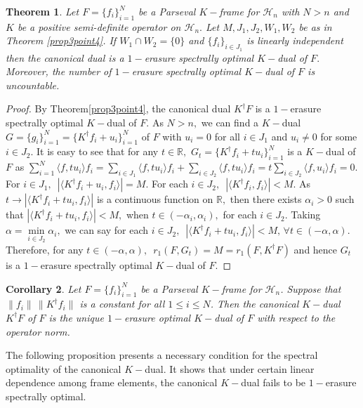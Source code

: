 \documentclass[final,1p,times]{elsarticle}
\newtheorem{thm}{Theorem}[section]
\newtheorem{cor}[thm]{Corollary}
\begin{document}
		\begin{thm}\label{thm3point4}
		Let $F = \{f_i\}_{i=1}^N $ be a Parseval $K-$frame for $\mathcal{H}_n$ with $N>n$ and $K$ be a positive semi-definite operator on $\mathcal{H}_n.$ Let $M, J_1, J_2, W_1, W_2$ be as in Theorem \ref{prop3point4}. If $W_1 \cap W_2 = \{0\}$ and $\{f_i\}_{i \in J_1}$ is linearly independent then the canonical dual is a $1-$erasure spectrally optimal $K-$dual of $F.$ Moreover, the number of  $1-$erasure spectrally optimal $K-$dual of $F$ is uncountable.
	\end{thm}
	\begin{proof}
		By Theorem\ref{prop3point4}, the canonical dual $K^\dag F$ is a $1-$erasure spectrally optimal $K-$dual of $F.$ As $N>n,$ we can find a $K-$dual  $G=  \{g_i\}_{i=1}^N = \{K^\dag f_i + u_i \}_{i=1}^N $ of $F$ with $u_i = 0$ for all $i \in J_1$ and $u_i \neq 0$ for some $i \in J_2.$ It is easy to see that for any $t \in \mathbb{R},$ $G_t =  \{K^\dag f_i + tu_i \}_{i=1}^N $ is a $K-$dual of $F$ as $\sum\limits_{i=1}^N \langle f, tu_i\rangle f_i = \sum\limits_{i \in J_1} \langle f, tu_i\rangle f_i + \sum\limits_{i \in J_2} \langle f, tu_i\rangle f_i =  t\sum\limits_{i \in J_2} \langle f, u_i\rangle f_i =0. $ For $i \in J_1,\,$ $\left| \langle K^\dag f_i + u_i , f_i \rangle \right| = M.$ For each $i \in J_2,\,$  $\left| \langle K^\dag f_i , f_i \rangle \right| < M.$ As $t \to \left| \langle K^\dag f_i +tu_i , f_i \rangle \right|$ is a continuous function on $\mathbb{R},$ then  there exists $\alpha_i > 0$ such that $ \left| \langle K^\dag f_i +tu_i , f_i \rangle \right| < M,$ when $t \in (-\alpha_i, \alpha_i),$   for each $i \in J_2.$ Taking $\alpha = \min\limits_{i \in J_2} \alpha_i,$ we can say  for each $i \in J_2,\,$ $\left| \langle K^\dag f_i + tu_i , f_i \rangle \right| < M,\,\forall t \in (-\alpha, \alpha).$ Therefore, for any $t \in  (-\alpha, \alpha),\,$ $r_{1}(F,G_t) = M = r_{1}(F,K^\dag F)$ and hence $G_t$ is a $1-$erasure  spectrally optimal $K-$dual of $F.$
	\end{proof}
	
	
	
	\begin{cor}
Let $F = \{f_i\}_{i=1}^N$ be a Parseval $K-$frame for $\mathcal{H}_n$. Suppose  that $\|f_i\|\,\|K^\dag f_i\|$ is a constant for all $1 \leq i \leq N$. Then the canonical $K-$dual $K^\dag F$ of $F$ is the unique $1-$erasure optimal $K-$dual of $F$ with respect to the operator norm.
\end{cor}

	The following proposition presents a necessary condition for the spectral optimality of the canonical $K-$dual. It shows that under certain linear dependence among frame elements, the canonical $K-$dual fails to be $1-$erasure spectrally optimal.
	
\end{document}
